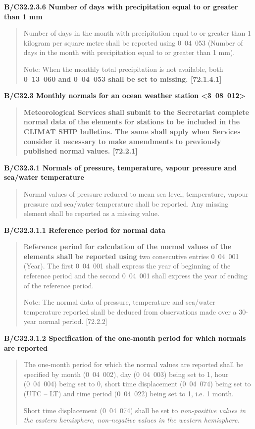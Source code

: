 \textbf{B/C32.2.3.6 Number of days with precipitation equal to or greater than 1 mm}

\begin{quote}
Number of days in the month with precipitation equal to or greater than 1 kilogram per square metre shall be reported using 0~04~053 (Number of days in the month with precipitation equal to or greater than 1 mm).

Note: When the monthly total precipitation is not available, both \textbf{0~13~060 and 0~04~053 shall be set to missing. {[}72.1.4.1{]}}
\end{quote}

\textbf{B/C32.3 Monthly normals for an ocean weather station \textless3~08~012\textgreater{}}

\begin{quote}
\textbf{Meteorological Services shall submit to the Secretariat complete normal data of the elements for stations to be included in the CLIMAT SHIP bulletins. The same shall apply when Services consider it necessary to make amendments to previously published normal values. {[}72.2.1{]}}
\end{quote}

\textbf{B/C32.3.1 Normals of pressure, temperature, vapour pressure and sea/water temperature}

\begin{quote}
Normal values of pressure reduced to mean sea level, temperature, vapour pressure and sea/water temperature shall be reported. Any missing element shall be reported as a missing value.
\end{quote}

\textbf{B/C32.3.1.1 Reference period for normal data}

\begin{quote}
R\textbf{eference period for calculation of the normal values of the elements shall be reported using} two consecutive entries 0~04~001 (Year). The first 0~04~001 shall express the year of beginning of the reference period and the second 0~04~001 shall express the year of ending of the reference period.

Note: The normal data of pressure, temperature and sea/water temperature reported shall be deduced from observations made over a 30-year normal period. {[}72.2.2{]}
\end{quote}

\textbf{B/C32.3.1.2 Specification of the one-month period for which normals are reported}

\begin{quote}
The one-month period for which the normal values are reported shall be specified by month (0~04~002), day (0~04~003) being set to 1, hour (0~04~004) being set to 0, short time displacement (0~04~074) being set to (UTC -- LT) and time period (0~04~022) being set to 1, i.e. 1 month.

Short time displacement (0~04~074) shall be set to \emph{non-positive values in the eastern hemisphere, non-negative values in the western hemisphere}.
\end{quote}

